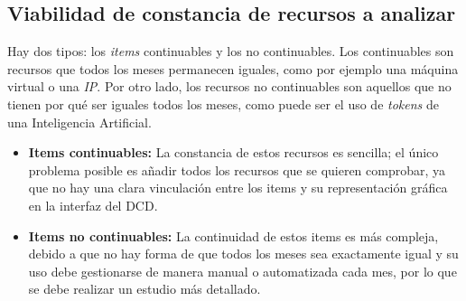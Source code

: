 \subsection{Viabilidad de constancia de recursos a analizar}
Hay dos tipos: los \textit{items} continuables y los no continuables. Los continuables son recursos que todos los meses permanecen iguales, como por ejemplo una máquina virtual o una \textit{IP}. Por otro lado, los recursos no continuables son aquellos que no tienen por qué ser iguales todos los meses, como puede ser el uso de \textit{tokens} de una Inteligencia Artificial.
\begin{itemize}
    \item \textbf{Items continuables:} La constancia de estos recursos es sencilla; el único problema posible es añadir todos los recursos que se quieren comprobar, ya que no hay una clara vinculación entre los items y su representación gráfica en la interfaz del DCD.
    \item \textbf{Items no continuables:} La continuidad de estos items es más compleja, debido a que no hay forma de que todos los meses sea exactamente igual y su uso debe gestionarse de manera manual o automatizada cada mes, por lo que se debe realizar un estudio más detallado.
\end{itemize}







